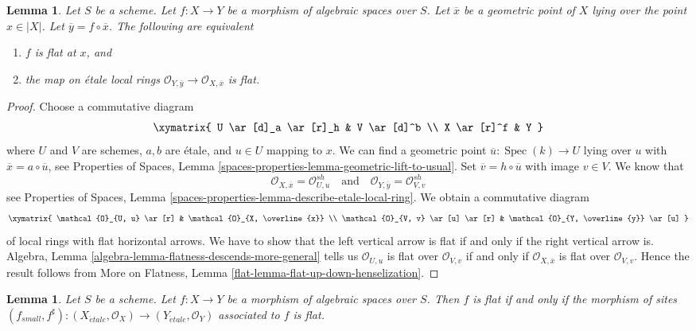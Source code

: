 \documentclass{stacks-project}
\theoremstyle{plain}
\newtheorem{lemma}[subsection]{Lemma}
\theoremstyle{definition}
\theoremstyle{remark}
\numberwithin{equation}{subsection}
\def\Spec{\mathop{\mathrm{Spec}}}
\def\etale{{\acute{e}tale}}
\begin{document}
\begin{lemma}
\label{lemma-flat-at-point-etale-local-rings}
Let $S$ be a scheme.
Let $f : X \to Y$ be a morphism of algebraic spaces over $S$.
Let $\overline{x}$ be a geometric point of $X$ lying over the point
$x \in |X|$. Let $\overline{y} = f \circ \overline{x}$. The following
are equivalent
\begin{enumerate}
\item $f$ is flat at $x$, and
\item the map on \'etale local rings
$\mathcal{O}_{Y, \overline{y}} \to \mathcal{O}_{X, \overline{x}}$
is flat.
\end{enumerate}
\end{lemma}

\begin{proof}
Choose a commutative diagram
$$
\xymatrix{
U \ar[d]_a \ar[r]_h & V \ar[d]^b \\
X \ar[r]^f & Y
}
$$
where $U$ and $V$ are schemes, $a, b$ are \'etale, and
$u \in U$ mapping to $x$. We can find a geometric point
$\overline{u} : \Spec(k) \to U$ lying over $u$ with
$\overline{x} = a \circ \overline{u}$, see
Properties of Spaces, Lemma
\ref{spaces-properties-lemma-geometric-lift-to-usual}.
Set $\overline{v} = h \circ \overline{u}$ with image $v \in V$.
We know that
$$
\mathcal{O}_{X, \overline{x}} = \mathcal{O}_{U, u}^{sh}
\quad\text{and}\quad
\mathcal{O}_{Y, \overline{y}} = \mathcal{O}_{V, v}^{sh}
$$
see
Properties of Spaces, Lemma
\ref{spaces-properties-lemma-describe-etale-local-ring}.
We obtain a commutative diagram
$$
\xymatrix{
\mathcal{O}_{U, u} \ar[r] &
\mathcal{O}_{X, \overline{x}} \\
\mathcal{O}_{V, v} \ar[u] \ar[r] &
\mathcal{O}_{Y, \overline{y}} \ar[u]
}
$$
of local rings with flat horizontal arrows. We have to show that the
left vertical arrow is flat if and only if the right vertical arrow is.
Algebra, Lemma \ref{algebra-lemma-flatness-descends-more-general}
tells us $\mathcal{O}_{U, u}$ is flat over $\mathcal{O}_{V, v}$
if and only if $\mathcal{O}_{X, \overline{x}}$ is flat over
$\mathcal{O}_{V, v}$. Hence the result follows from
More on Flatness, Lemma \ref{flat-lemma-flat-up-down-henselization}.
\end{proof}

\begin{lemma}
\label{lemma-flat-morphism-sites}
Let $S$ be a scheme.
Let $f : X \to Y$ be a morphism of algebraic spaces over $S$.
Then $f$ is flat if and only if the morphism of sites
$
(f_{small}, f^\sharp) :
(X_\etale, \mathcal{O}_X)
\to
(Y_\etale, \mathcal{O}_Y)
$
associated to $f$ is flat.
\end{lemma}
\end{document}
